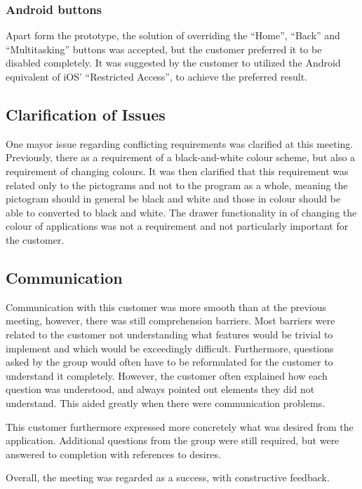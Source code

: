 \subsubsection{Android buttons}
Apart form the prototype, the solution of overriding the ``Home'', ``Back'' and ``Multitasking'' buttons was accepted, but the customer preferred it to be disabled completely.
It was suggested by the customer to utilized the Android equivalent of iOS' ``Restricted Access'', to achieve the preferred result.

\subsection{Clarification of Issues}
One mayor issue regarding conflicting requirements was clarified at this meeting.
Previously, there as a requirement of a black-and-white colour scheme, but also a requirement of changing colours.
It was then clarified that this requirement was related only to the pictograms and not to the program as a whole, meaning the pictogram should in general be black and white and those in colour should be able to converted to black and white.
The drawer functionality in \launcher of changing the colour of applications was not a requirement and not particularly important for the customer.

\subsection{Communication}
Communication with this customer was more smooth than at the previous meeting, however, there was still comprehension barriers.
Most barriers were related to the customer not understanding what features would be trivial to implement and which would be exceedingly difficult.
Furthermore, questions asked by the group would often have to be reformulated for the customer to understand it completely.
However, the customer often explained how each question was understood, and always pointed out elements they did not understand.
This aided greatly when there were communication problems.

This customer furthermore expressed more concretely what was desired from the application.
Additional questions from the group were still required, but were answered to completion with references to desires.

Overall, the meeting was regarded as a success, with constructive feedback.

